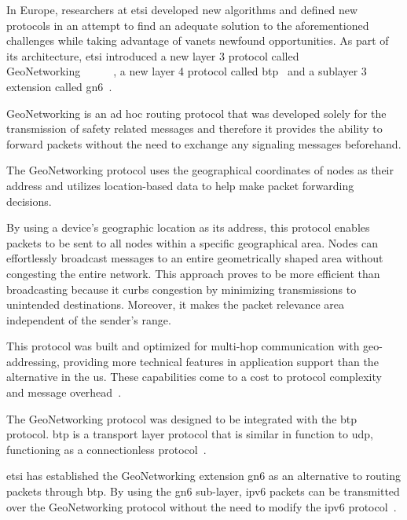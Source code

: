 In Europe, researchers at \gls{etsi} developed new algorithms and defined new protocols in an attempt to find an adequate solution to the aforementioned challenges while taking advantage of \glspl{vanet} newfound opportunities. As part of its architecture, \gls{etsi} introduced a new layer 3 protocol called GeoNetworking~\cite{etsi_intelligent_2014-1}~\cite{etsi_intelligent_2013-1}~\cite{etsi_intelligent_2014}~\cite{etsi_intelligent_2020-1}~\cite{etsi_intelligent_2019}~\cite{etsi_intelligent_2014-2}, a new layer 4 protocol called \gls{btp}~\cite{etsi_intelligent_2019} and a sublayer 3 extension called \gls{gn6}~\cite{etsi_intelligent_2014-2}.

GeoNetworking is an ad hoc routing protocol that was developed solely for the transmission of safety related messages and therefore it provides the ability to forward packets without the need to exchange any signaling messages beforehand.

The GeoNetworking protocol uses the geographical coordinates of nodes as their address and utilizes location-based data to help make packet forwarding decisions. 

By using a device's geographic location as its address, this protocol enables packets to be sent to all nodes within a specific geographical area. Nodes can effortlessly broadcast messages to an entire geometrically shaped area without congesting the entire network. This approach proves to be more efficient than broadcasting because it curbs congestion by minimizing transmissions to unintended destinations. Moreover, it makes the packet relevance area independent of the sender's range.

This protocol was built and optimized for multi-hop communication with geo-addressing, providing more technical features in application support than the alternative in the \gls{us}. These capabilities come to a cost to protocol complexity and message overhead~\cite{festag_standards_2015}.

The GeoNetworking protocol was designed to be integrated with the \gls{btp} protocol. \gls{btp} is a transport layer protocol that is similar in function to \gls{udp}, functioning as a connectionless protocol~\cite{festag_cooperative_2014}.

\gls{etsi} has established the GeoNetworking extension \gls{gn6} as an alternative to routing packets through \gls{btp}. By using the \gls{gn6} sub-layer, \gls{ipv6} packets can be transmitted over the GeoNetworking protocol without the need to modify the \gls{ipv6} protocol~\cite{festag_cooperative_2014}.


